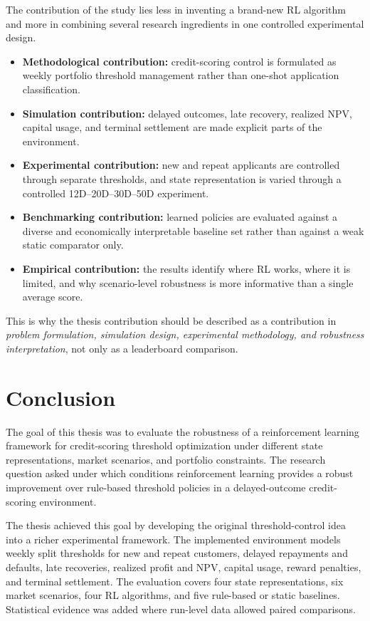 \documentclass[12pt,a4paper]{article}
\begin{document}
The contribution of the study lies less in inventing a brand-new RL algorithm and more in combining several research ingredients in one controlled experimental design.
\begin{itemize}[leftmargin=*]
    \item \textbf{Methodological contribution:} credit-scoring control is formulated as weekly portfolio threshold management rather than one-shot application classification.
    \item \textbf{Simulation contribution:} delayed outcomes, late recovery, realized NPV, capital usage, and terminal settlement are made explicit parts of the environment.
    \item \textbf{Experimental contribution:} new and repeat applicants are controlled through separate thresholds, and state representation is varied through a controlled 12D--20D--30D--50D experiment.
    \item \textbf{Benchmarking contribution:} learned policies are evaluated against a diverse and economically interpretable baseline set rather than against a weak static comparator only.
    \item \textbf{Empirical contribution:} the results identify where RL works, where it is limited, and why scenario-level robustness is more informative than a single average score.
\end{itemize}

This is why the thesis contribution should be described as a contribution in \emph{problem formulation, simulation design, experimental methodology, and robustness interpretation}, not only as a leaderboard comparison.

\section{Conclusion}

The goal of this thesis was to evaluate the robustness of a reinforcement learning framework for credit-scoring threshold optimization under different state representations, market scenarios, and portfolio constraints. The research question asked under which conditions reinforcement learning provides a robust improvement over rule-based threshold policies in a delayed-outcome credit-scoring environment.

The thesis achieved this goal by developing the original threshold-control idea into a richer experimental framework. The implemented environment models weekly split thresholds for new and repeat customers, delayed repayments and defaults, late recoveries, realized profit and NPV, capital usage, reward penalties, and terminal settlement. The evaluation covers four state representations, six market scenarios, four RL algorithms, and five rule-based or static baselines. Statistical evidence was added where run-level data allowed paired comparisons.
\end{document}
